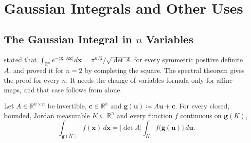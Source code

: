 \section{Gaussian Integrals and Other Uses}
\label{sec:gaussian-uses}

\subsection{The Gaussian Integral in \texorpdfstring{$n$}{n} Variables}

 stated that $\int_{\mathbb R^n}e^{-\langle\mathbf x,A\mathbf x\rangle}d\mathbf x=\pi^{n/2}/\sqrt{\det A}$ for every symmetric positive definite $A$, and proved it for $n=2$ by completing the square. The spectral theorem gives the proof for every $n$. It needs the change of variables formula only for affine maps, and that case follows from  alone.

\begin{lemma}
\label{lem:affine-substitution}
Let $A\in\mathbb R^{n\times n}$ be invertible, $\mathbf c\in\mathbb R^n$ and $\mathbf g(\mathbf u)\coloneqq A\mathbf u+\mathbf c$. For every closed, bounded, Jordan measurable $K\subseteq\mathbb R^n$ and every function $f$ continuous on $\mathbf g(K)$,
\[
\int_{\mathbf g(K)}f(\mathbf x)\,d\mathbf x=|\det A|\int_Kf\bigl(\mathbf g(\mathbf u)\bigr)\,d\mathbf u .
\]
\end{lemma}

